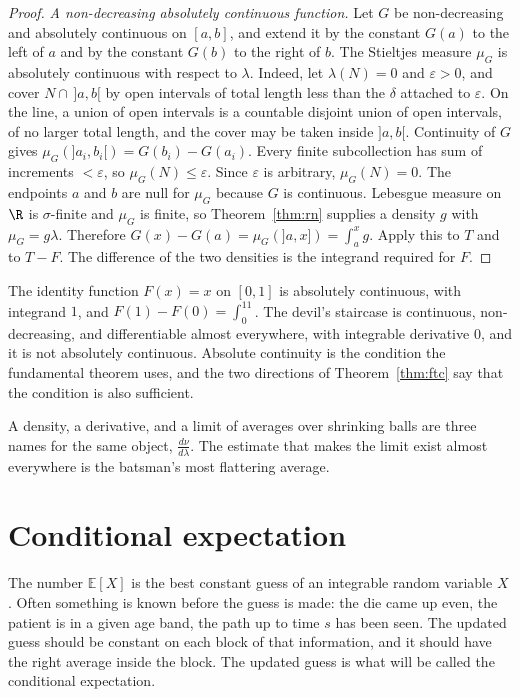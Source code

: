 \begin{proof}
\emph{A non-decreasing absolutely continuous function.} Let $G$ be non-decreasing and absolutely continuous on $[a,b]$, and extend it by the constant $G(a)$ to the left of $a$ and by the constant $G(b)$ to the right of $b$. The Stieltjes measure $\mu_G$ is absolutely continuous with respect to $\lambda$. Indeed, let $\lambda(N)=0$ and $\varepsilon>0$, and cover $N\cap\,]a,b[$ by open intervals of total length less than the $\delta$ attached to $\varepsilon$. On the line, a union of open intervals is a countable disjoint union of open intervals, of no larger total length, and the cover may be taken inside $]a,b[$. Continuity of $G$ gives $\mu_G(]a_i,b_i[)=G(b_i)-G(a_i)$. Every finite subcollection has sum of increments $<\varepsilon$, so $\mu_G(N)\le\varepsilon$. Since $\varepsilon$ is arbitrary, $\mu_G(N)=0$. The endpoints $a$ and $b$ are null for $\mu_G$ because $G$ is continuous. Lebesgue measure on $\R$ is $\sigma$-finite and $\mu_G$ is finite, so Theorem~\ref{thm:rn} supplies a density $g$ with $\mu_G=g\lambda$. Therefore $G(x)-G(a)=\mu_G(]a,x])=\int_a^xg$. Apply this to $T$ and to $T-F$. The difference of the two densities is the integrand required for $F$.
\end{proof}

The identity function $F(x)=x$ on $[0,1]$ is absolutely continuous, with integrand $1$, and $F(1)-F(0)=\int_0^11$. The devil's staircase is continuous, non-decreasing, and differentiable almost everywhere, with integrable derivative $0$, and it is not absolutely continuous. Absolute continuity is the condition the fundamental theorem uses, and the two directions of Theorem~\ref{thm:ftc} say that the condition is also sufficient.

\begin{beauty}
A density, a derivative, and a limit of averages over shrinking balls are three names for the same object, $\frac{d\nu}{d\lambda}$. The estimate that makes the limit exist almost everywhere is the batsman's most flattering average.
\end{beauty}

\section{Conditional expectation}

The number $\mathbb E[X]$ is the best constant guess of an integrable random variable $X$. Often something is known before the guess is made: the die came up even, the patient is in a given age band, the path up to time $s$ has been seen. The updated guess should be constant on each block of that information, and it should have the right average inside the block. The updated guess is what will be called the conditional expectation.

